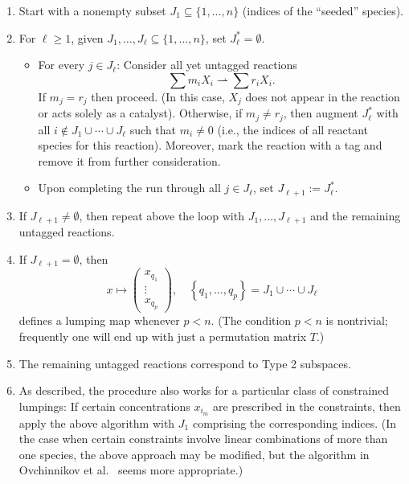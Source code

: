 \documentclass{article}
\begin{document}
\begin{enumerate}
    \item Start with a nonempty subset $J_1\subseteq\{1,\ldots,n   \}$ (indices of the ``seeded'' species).
    \item For $\ell\geq 1$, given $J_1,\ldots,J_\ell\subseteq\{1,\ldots,n   \}$, set $J_\ell^*=\emptyset$.
    \begin{itemize}
        \item For every $j\in J_\ell$: Consider all yet untagged reactions
        \[
        \sum m_iX_i\rightharpoonup \sum r_iX_i.
        \]
        If $m_j= r_j$ then proceed. (In this case, $X_j$ does not appear in the reaction or acts solely as a catalyst). Otherwise, if $m_j\not=r_j$, then augment $J_\ell^*$ with all $i\not\in J_1\cup\cdots\cup J_\ell$ such that $m_i\not=0$ (i.e., the indices of all reactant species for this reaction). Moreover, mark the reaction with a tag and remove it from further consideration.
        \item Upon completing the run through all $j\in J_\ell$, set $J_{\ell+1}:=J_\ell^*$.
    \end{itemize}
    \item If $J_{\ell+1}\not=\emptyset$, then repeat above the loop with $J_1,\ldots,J_{\ell+1}$ and the remaining untagged reactions.
    \item If $J_{\ell+1}=\emptyset$, then 
    \[
    x\mapsto \begin{pmatrix}
        x_{q_1}\\ \vdots \\x_{q_p}
    \end{pmatrix}, \quad \left\{q_1,\ldots,q_p\right\}=J_1\cup\cdots\cup J_\ell
    \]
    defines a lumping map whenever $p<n$. (The condition $p<n$ is nontrivial; frequently one will end up with just a permutation matrix $T$.)
    \item The remaining untagged reactions correspond to Type 2 subspaces.
    \item As described, the procedure also works for a particular class of constrained lumpings: If certain concentrations $x_{i_m}$ are prescribed in the constraints, then apply the above algorithm with $J_1$ comprising the corresponding indices. (In the case when certain constraints involve linear combinations of more than one species, the above approach may be modified, but the algorithm in Ovchinnikov et al.~\cite{OVPT2021} seems more appropriate.)
\end{enumerate}
\end{document}
